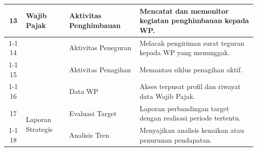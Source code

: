 \begin{longtable}{|c|p{2cm}|p{2cm}|p{4cm}|}
13 & \multirow{4}{2cm}{Wajib Pajak} & Aktivitas Penghimbauan & Mencatat dan memonitor kegiatan penghimbauan kepada WP. \\ \cline{1-1} \cline{3-4}
14 &  & Aktivitas Peneguran & Melacak pengiriman surat teguran kepada WP yang menunggak. \\ \cline{1-1} \cline{3-4}
15 &  & Aktivitas Penagihan & Memantau siklus penagihan aktif. \\ \cline{1-1} \cline{3-4}
16 &  & Data WP & Akses terpusat profil dan riwayat data Wajib Pajak. \\ \hline

17 & \multirow{2}{2cm}{Laporan Strategis} & Evaluasi Target & Laporan perbandingan target dengan realisasi periode tertentu. \\ \cline{1-1} \cline{3-4}
18 &  & Analisis Tren & Menyajikan analisis kenaikan atau penurunan pendapatan. \\ \hline
\end{longtable}


